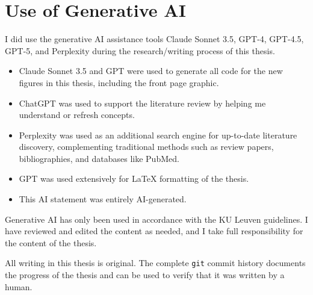 \cleardoublepage
\chapter*{Use of Generative AI}

I did use the generative AI assistance tools Claude Sonnet 3.5, GPT-4, GPT-4.5, GPT-5, and Perplexity during the research/writing process of this thesis.

\begin{itemize}
  \item Claude Sonnet 3.5 and GPT were used to generate all code for the new figures in this thesis, including the front page graphic.
  \item ChatGPT was used to support the literature review by helping me understand or refresh concepts.
  \item Perplexity was used as an additional search engine for up-to-date literature discovery, complementing traditional methods such as review papers, bibliographies, and databases like PubMed.
  \item GPT was used extensively for \LaTeX{} formatting of the thesis.
  \item This AI statement was entirely AI-generated.
\end{itemize}

Generative AI has only been used in accordance with the KU Leuven guidelines. I have reviewed and edited the content as needed, and I take full responsibility for the content of the thesis.  

All writing in this thesis is original. The complete \texttt{git} commit history documents the progress of the thesis and can be used to verify that it was written by a human.
